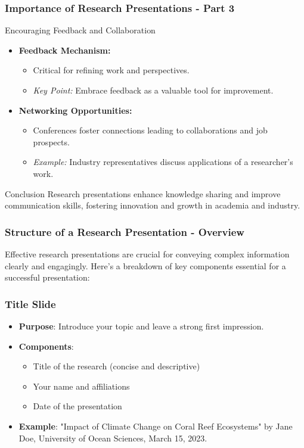 \documentclass[aspectratio=169]{beamer}
\begin{document}
\begin{frame}[fragile]
    \frametitle{Importance of Research Presentations - Part 3}
    
    \begin{block}{Encouraging Feedback and Collaboration}
        \begin{itemize}
            \item \textbf{Feedback Mechanism:}
            \begin{itemize}
                \item Critical for refining work and perspectives.
                \item \emph{Key Point:} Embrace feedback as a valuable tool for improvement.
            \end{itemize}
            
            \item \textbf{Networking Opportunities:}
            \begin{itemize}
                \item Conferences foster connections leading to collaborations and job prospects.
                \item \emph{Example:} Industry representatives discuss applications of a researcher's work.
            \end{itemize}
        \end{itemize}
    \end{block}
    
    \begin{block}{Conclusion}
        Research presentations enhance knowledge sharing and improve communication skills, fostering innovation and growth in academia and industry.
    \end{block}
\end{frame}

\begin{frame}[fragile]
    \frametitle{Structure of a Research Presentation - Overview}
    Effective research presentations are crucial for conveying complex information clearly and engagingly. Here’s a breakdown of key components essential for a successful presentation:
\end{frame}

\begin{frame}[fragile]
    \frametitle{Title Slide}
    \begin{itemize}
        \item \textbf{Purpose}: Introduce your topic and leave a strong first impression.
        \item \textbf{Components}:
        \begin{itemize}
            \item Title of the research (concise and descriptive)
            \item Your name and affiliations
            \item Date of the presentation
        \end{itemize}
        \item \textbf{Example}: "Impact of Climate Change on Coral Reef Ecosystems" by Jane Doe, University of Ocean Sciences, March 15, 2023.
    \end{itemize}
\end{frame}
\end{document}
